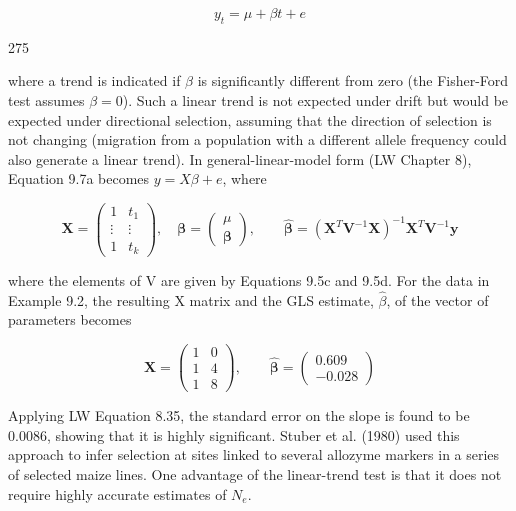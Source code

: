 \documentclass{article}
\begin{document}
\begin{equation}
y_{t}=\mu+\beta t+e
\tag{9.7a}
\label{eq:9_7a}
\end{equation}

275

where a trend is indicated if  $ \beta $ is significantly different from zero (the Fisher-Ford test assumes  $ \beta = 0 $). Such a linear trend is not expected under drift but would be expected under directional selection, assuming that the direction of selection is not changing (migration from a population with a different allele frequency could also generate a linear trend). In general-linear-model form (LW Chapter 8), Equation 9.7a becomes  $ y = X\beta + e $, where

\begin{equation}
\mathbf{X}=\begin{pmatrix}1&t_{1}\\\vdots&\vdots\\1&t_{k}\end{pmatrix},\quad\boldsymbol{\beta}=\begin{pmatrix}\mu\\\boldsymbol{\beta}\end{pmatrix},\qquad\widehat{\boldsymbol{\beta}}=(\mathbf{X}^{T}\mathbf{V}^{-1}\mathbf{X})^{-1}\mathbf{X}^{T}\mathbf{V}^{-1}\mathbf{y}
\tag{9.7b}
\label{eq:9_7b}
\end{equation}

where the elements of V are given by Equations 9.5c and 9.5d. For the data in Example 9.2, the resulting X matrix and the GLS estimate,  $ \widehat{\beta} $, of the vector of parameters becomes

\begin{equation}
\mathbf{X}=\begin{pmatrix}{{{1}}}&{{{0}}} \\{{{1}}}&{{{4}}} \\{{{1}}}&{{{8}}}\end{pmatrix},\qquad\widehat{\boldsymbol{\beta}}=\begin{pmatrix}{{{0.609}}} \\{{{-0.028}}}\end{pmatrix}
\end{equation}

Applying LW Equation 8.35, the standard error on the slope is found to be 0.0086, showing that it is highly significant. Stuber et al. (1980) used this approach to infer selection at sites linked to several allozyme markers in a series of selected maize lines. One advantage of the linear-trend test is that it does not require highly accurate estimates of  $ N_{e} $.
\end{document}
